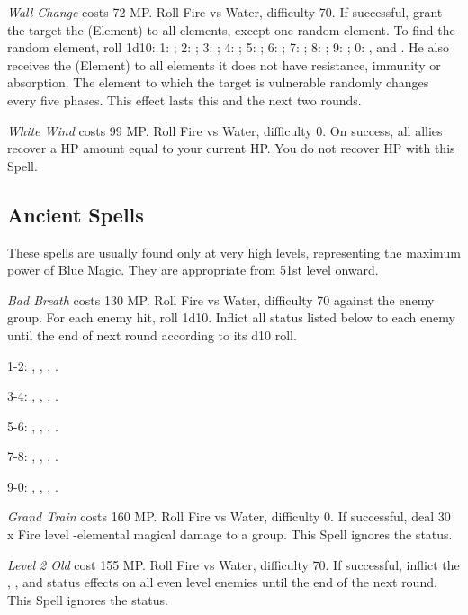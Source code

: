 \begin{multicols}{2}
	\textit{Wall Change} costs 72 MP. Roll Fire vs Water, difficulty 70. If successful, grant the target the (Element)  to all elements, except one random element. To find the random element, roll 1d10: 1: ; 2: ; 3: ; 4: ; 5: ; 6: ; 7: ; 8: ; 9: ; 0: ,  and . He also receives the (Element)  to all elements it does not have resistance, immunity or absorption. The element to which the target is vulnerable randomly changes every five phases. This effect lasts this and the next two rounds.
    
    \textit{White Wind} costs 99 MP. Roll Fire vs Water, difficulty 0. On success, all allies recover a HP amount equal to your current HP. You do not recover HP with this Spell.

\subsection{Ancient Spells}

	These spells are usually found only at very high levels, representing the maximum power of Blue Magic. They are appropriate from 51st level onward.
    
    \textit{Bad Breath} costs 130 MP. Roll Fire vs Water, difficulty 70 against the enemy group. For each enemy hit, roll 1d10. Inflict all status listed below to each enemy until the end of next round according to its d10 roll.

1-2: , , , .

3-4: , , , .

5-6: , , , .

7-8: , , , .

9-0: , , , .

    \textit{Grand Train} costs 160 MP. Roll Fire vs Water, difficulty 0. If successful, deal 30 x Fire level -elemental magical damage to a group. This Spell ignores the  status.
    
    \textit{Level 2 Old} cost 155 MP. Roll Fire vs Water, difficulty 70. If successful, inflict the , ,  and  status effects on all even level enemies until the end of the next round. This Spell ignores the  status.
    

\end{multicols}
